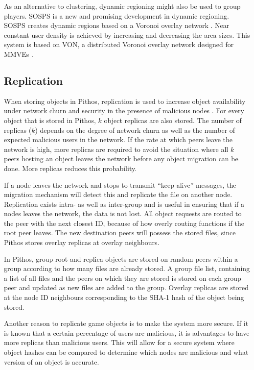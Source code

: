 \documentclass[10pt,a4paper,conference]{IEEEtran}
\begin{document}
As an alternative to clustering, dynamic regioning might also be used to group players. SOSPS is a new and promising development in dynamic
regioning. SOSPS creates dynamic regions based on a Voronoi overlay network \cite{voronoi_diagrams_survey}. Near constant user density is achieved by
increasing and decreasing the area sizes. This system is based on VON, a distributed Voronoi overlay network designed for MMVEs \cite{VON_VAST}.

\subsection{Replication}
\label{store_retrieve}

When storing objects in Pithos, replication is used to increase object availability under network churn and security in the presence of malicious
nodes \cite{storage_and_chaching_PAST}. For every object that is stored in Pithos, $k$ object replicas are also stored. The number of replicas ($k$)
depends on the degree of network churn as well as the number of expected malicious users in the network. If the rate at which peers leave the network
is high, more replicas are required to avoid the situation where all $k$ peers hosting an object leaves the network before any object migration can
be done. More replicas reduces this probability.

If a node leaves the network and stops to transmit ``keep alive'' messages, the migration mechanism will detect this and replicate the file on
another node. Replication exists intra- as well as inter-group and is useful in ensuring that if a nodes leaves the network, the data is not lost.
All object requests are routed to the peer with the next closest ID, because of how overly routing functions if the root peer leaves. The new
destination peers will possess the stored files, since Pithos stores overlay replicas at overlay neighbours.

In Pithos, group root and replica objects are stored on random peers within a group according to how many files are already stored. A group file
list, containing a list of all files and the peers on which they are stored is stored on each group peer and updated as new files are added to the
group. Overlay replicas are stored at the node ID neighbours corresponding to the SHA-1 hash of the object being stored.

Another reason to replicate game objects is to make the system more secure. If it is known that a certain percentage of users are malicious, it is
advantages to have more replicas than malicious users. This will allow for a secure system where object hashes can be compared to determine which
nodes are malicious and what version of an object is accurate.
\end{document}
